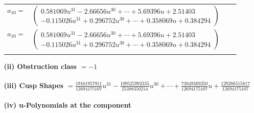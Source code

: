 \documentclass[1p]{elsarticle_modified}
\theoremstyle{definition}
\begin{document}
\begin{tabular}{m{7pt} m{180pt} m{7pt} m{180pt} }
\flushright $a_{10}=$&$\begin{pmatrix}0.581069 u^{31}-2.66656 u^{30}+\cdots+5.69396 u+2.51403\\-0.115026 u^{31}+0.296752 u^{30}+\cdots+0.358069 u+0.384294\end{pmatrix}$\\ \flushright $a_{10}=$&$\begin{pmatrix}0.581069 u^{31}-2.66656 u^{30}+\cdots+5.69396 u+2.51403\\-0.115026 u^{31}+0.296752 u^{30}+\cdots+0.358069 u+0.384294\end{pmatrix}$\\&\end{tabular}
\flushleft \textbf{(ii) Obstruction class $= -1$}\\~\\
\flushleft \textbf{(iii) Cusp Shapes $= \frac{19161957911}{12694175107} u^{31}-\frac{109525992335}{25388350214} u^{30}+\cdots+\frac{73849369350}{12694175107} u+\frac{129286515817}{12694175107}$}\\~\\
\newpage\renewcommand{\arraystretch}{1}
\flushleft \textbf{(iv) u-Polynomials at the component}\newline \\
\end{document}
